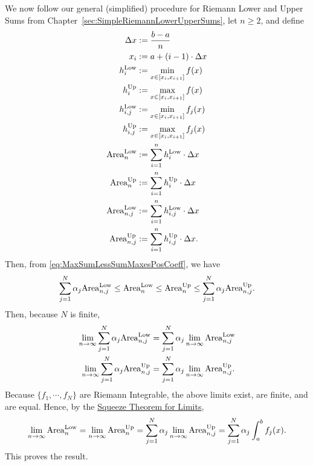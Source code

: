We now follow our general (simplified) procedure for Riemann Lower and Upper Sums from Chapter~\ref{sec:SimpleRiemannLowerUpperSums}, let $n\ge 2$, and define
\begin{equation}
    \begin{aligned}
        \Delta x&:= \frac{b-a}{n}\\
        x_i&:= a + (i-1)\cdot \Delta x \\
        h_i^{\rm Low} &:=  \min_{x \in [x_i, x_{i+1}]} f(x) \\
        h_i^{\rm Up} &:=  \max_{x \in [x_i, x_{i+1}]} f(x) \\
        h_{i,j}^{\rm Low} &:=  \min_{x \in [x_i, x_{i+1}]} f_j(x) \\
        h_{i,j}^{\rm Up} &:=  \max_{x \in [x_i, x_{i+1}]} f_j(x) \\
    {\rm Area}^{\rm Low}_n &: = \sum_{i=1}^n h_i^{\rm Low} \cdot \Delta x \\
    {\rm Area}^{\rm Up}_n &: = \sum_{i=1}^n h_i^{\rm Up} \cdot \Delta x \\
    {\rm Area}^{\rm Low}_{n,j} &: = \sum_{i=1}^n h_{i,j}^{\rm Low} \cdot \Delta x \\
    {\rm Area}^{\rm Up}_{n,j} &: = \sum_{i=1}^n h_{i,j}^{\rm Up} \cdot \Delta x.
    \end{aligned}
\end{equation}
Then, from \eqref{eq:MaxSumLessSumMaxesPosCoeff}, we have
\begin{equation}
    \sum_{j=1}^N \alpha_j  {\rm Area}^{\rm Low}_{n,j} \le  {\rm Area}^{\rm Low}_n  \le  {\rm Area}^{\rm Up}_n  \le   \sum_{j=1}^N \alpha_j  {\rm Area}^{\rm Up}_{n,j}. 
\end{equation}
Then, because $N$ is finite,
\begin{equation}
    \begin{aligned}
        \lim_{n \to \infty}  \sum_{j=1}^N \alpha_j  {\rm Area}^{\rm Low}_{n,j} &= \sum_{j=1}^N \alpha_j  \lim_{n \to \infty}   {\rm Area}^{\rm Low}_{n,j}\\
         \lim_{n \to \infty}  \sum_{j=1}^N \alpha_j  {\rm Area}^{\rm Up}_{n,j} &= \sum_{j=1}^N \alpha_j  \lim_{n \to \infty}   {\rm Area}^{\rm Up}_{n,j}.
    \end{aligned}
\end{equation}
Because $\{ f_1, \cdots, f_N \}$ are Riemann Integrable, the above limits exist, are finite, and are equal. Hence, by the \href{https://en.wikipedia.org/wiki/Squeeze_theorem#:~:text=The%20squeeze%20theorem%20is%20used,functions%20whose%20limits%20are%20known}{Squeeze Theorem for Limits}, 
$$ \lim_{n \to \infty} {\rm Area}^{\rm Low}_n =\lim_{n \to \infty} {\rm Area}^{\rm Up}_n = \sum_{j=1}^N \alpha_j  \lim_{n \to \infty}   {\rm Area}^{\rm Up}_{n,j} = \sum_{j=1}^N \alpha_j \int_a^b   f_j(x).$$
This proves the result.
\Qed

